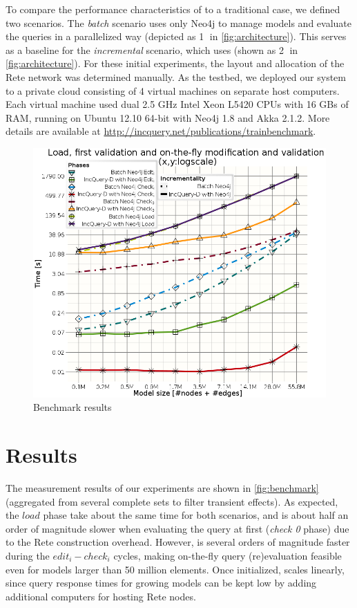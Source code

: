 To compare the performance characteristics of \iqd{} to a traditional case, we defined two scenarios. The \textit{batch} scenario uses only Neo4j to manage models and evaluate the queries in a parallelized way (depicted as \textcircled{1} in \autoref{fig:architecture}). This serves as a baseline for the \textit{incremental} scenario, which uses \iqd{} (shown as \textcircled{2} in \autoref{fig:architecture}). For these initial experiments, the layout and allocation of the Rete network was determined manually. As the testbed, we deployed our system to a private cloud consisting of 4 virtual machines on separate host computers. Each virtual machine used dual 2.5 GHz Intel Xeon L5420 CPUs with 16 GBs of RAM, running on Ubuntu 12.10 64-bit with Neo4j 1.8 and Akka 2.1.2. More details are available at \url{http://incquery.net/publications/trainbenchmark}.

\begin{figure}
\begin{center}
\includegraphics[width=\columnwidth]{figures/All_RouteSensor}
\caption{Benchmark results}
\label{fig:benchmark}
\end{center}
\end{figure}

\section{Results}
\label{benchmark_results}\label{analysis}

The measurement results of our experiments are shown in \autoref{fig:benchmark} (aggregated from several complete sets to filter transient effects). As expected, the $load$ phase take about the same time for both scenarios, and \iqd{} is about half an order of magnitude slower when evaluating the query at first (\textit{check 0} phase) due to the Rete construction overhead. However, \iqd{} is several orders of magnitude faster during the $edit_i - check_i$ cycles, making on-the-fly query (re)evaluation feasible even for models larger than 50 million elements. Once initialized, \iqd{} scales linearly, since query response times for growing models can be kept low by adding additional computers for hosting Rete nodes.

